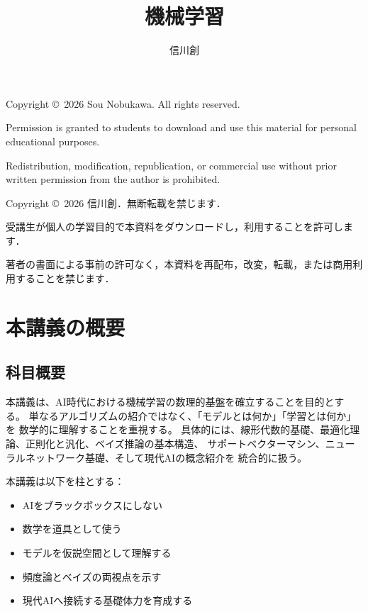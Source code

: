 




\title{機械学習}
\author{信川創}
\maketitle

\vfill
\begin{flushleft}
\small
Copyright \copyright\ 2026 Sou Nobukawa. All rights reserved.

\medskip
Permission is granted to students to download and use this material
for personal educational purposes.

\medskip
Redistribution, modification, republication, or commercial use
without prior written permission from the author is prohibited.

\bigskip
Copyright \copyright\ 2026 信川創．無断転載を禁じます．

\medskip
受講生が個人の学習目的で本資料をダウンロードし，利用することを許可します．

\medskip
著者の書面による事前の許可なく，本資料を再配布，改変，転載，または商用利用することを禁じます．
\end{flushleft}

\pagebreak
\tableofcontents

\pagebreak


\setcounter{section}{-1}
\section{本講義の概要}

\subsection{科目概要}

本講義は、AI時代における機械学習の数理的基盤を確立することを目的とする。
単なるアルゴリズムの紹介ではなく、「モデルとは何か」「学習とは何か」を
数学的に理解することを重視する。
具体的には、線形代数的基礎、最適化理論、正則化と汎化、ベイズ推論の基本構造、
サポートベクターマシン、ニューラルネットワーク基礎、そして現代AIの概念紹介を
統合的に扱う。

本講義は以下を柱とする：
\begin{itemize}
  \item AIをブラックボックスにしない
  \item 数学を道具として使う
  \item モデルを仮説空間として理解する
  \item 頻度論とベイズの両視点を示す
  \item 現代AIへ接続する基礎体力を育成する
\end{itemize}


